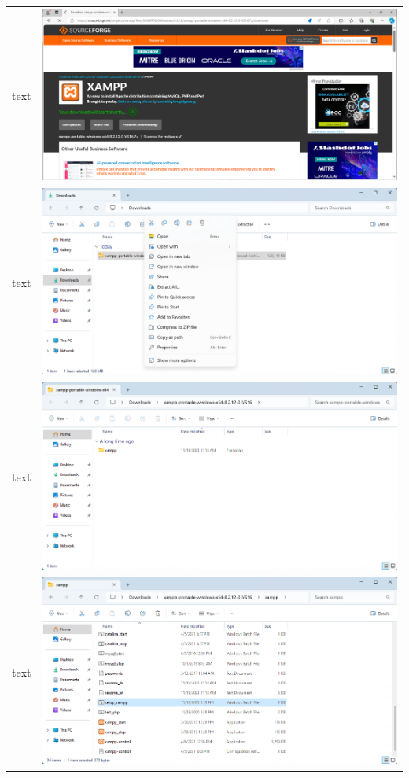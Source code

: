 \documentclass[11pt]{report}
\begin{document}
\begin{tabular}{ l r }
            text & \includegraphics[scale=1.0]{xampp05} \\
            text & \includegraphics[scale=1.0]{xampp06} \\
            text & \includegraphics[scale=1.0]{xampp07} \\
            text & \includegraphics[scale=1.0]{xampp08} \\

\end{tabular}
\end{document}

